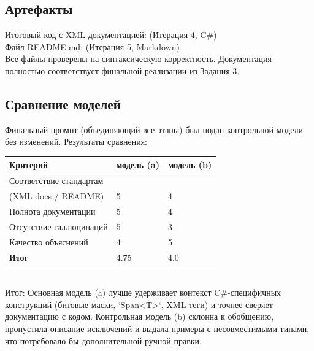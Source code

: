 \subsection{Артефакты}
Итоговый код с XML-документацией: (Итерация 4, C\#) \\
\noindent
Файл README.md: (Итерация 5, Markdown) \\
\noindent
Все файлы проверены на синтаксическую корректность. Документация полностью соответствует финальной реализации из Задания 3.

\subsection{Сравнение моделей}
Финальный промпт (объединяющий все этапы) был подан контрольной модели без изменений.
Результаты сравнения:
\begin{table}[h!]
\centering
\begin{tabular}{|l|p{5cm}|p{5cm}|}
\hline
\textbf{Критерий} & \textbf{модель (a)} & \textbf{модель (b)} \\
\hline
Соответствие стандартам \\ (XML docs / README) & 5 & 4 \\
\hline
Полнота документации & 5 & 4 \\
\hline
Отсутствие галлюцинаций & 5 & 3 \\
\hline
Качество объяснений & 4 & 5 \\
\hline
\textbf{Итог} & 4.75 & 4.0 \\
\hline
\end{tabular}
\end{table} \\
Итог: Основная модель (a) лучше удерживает контекст C\#-специфичных конструкций (битовые маски, `Span<T>`, XML-теги) и точнее сверяет документацию с кодом. Контрольная модель (b) склонна к обобщению, пропустила описание исключений и выдала примеры с несовместимыми типами, что потребовало бы дополнительной ручной правки.

